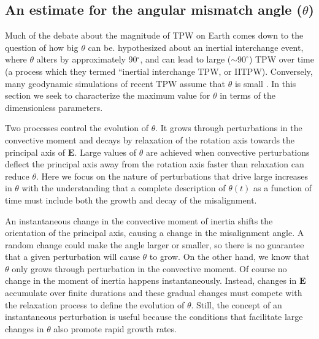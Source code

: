 \documentclass[preprint,12pt,authoryear]{elsarticle}
\begin{document}
\subsection{An estimate for the angular mismatch angle ($\theta$)}
\label{sec:theta}

Much of the debate about the magnitude of TPW on Earth comes down to the question of how big $\theta$ can be.
\citet{kirschvink1997evidence} hypothesized about an inertial interchange event, where $\theta$ alters by approximately 90$^\circ$,
and can lead to large ($\sim90^\circ$) TPW over time (a process which they termed ``inertial interchange TPW, or IITPW).
Conversely, many geodynamic simulations of recent TPW assume that $\theta$ is small \citep{steinberger1997changes}.
In this section we seek to characterize the maximum value for $\theta$ in terms of the dimensionless parameters.

Two processes control the evolution of $\theta$. It grows through perturbations in the convective moment and  decays by relaxation of the rotation axis towards the principal axis of $\mathbf{E}$. Large values of $\theta$ are achieved when
convective perturbations deflect the principal axis away from the rotation axis faster than relaxation can reduce $\theta$. Here we focus on the nature of
perturbations that drive large increases in $\theta$ with the understanding that a complete description of $\theta(t)$ as a function of time must include both the growth and decay of the misalignment. 

An instantaneous change in the convective moment of inertia shifts the orientation of the principal axis, causing a change in the misalignment angle. A random change could make the angle larger or smaller, so there is no guarantee that a given perturbation will cause $\theta$ to grow. On the other hand,  we know that $\theta$ only grows through perturbation in the convective moment. Of course no change in the moment of inertia happens instantaneously. Instead,  changes in $\mathbf{E}$ accumulate over  finite durations and these gradual changes must compete with the relaxation process to define the evolution of $\theta$. Still, the concept of an instantaneous perturbation is useful because the conditions that facilitate large changes in $\theta$ also promote rapid growth rates. 
\end{document}
